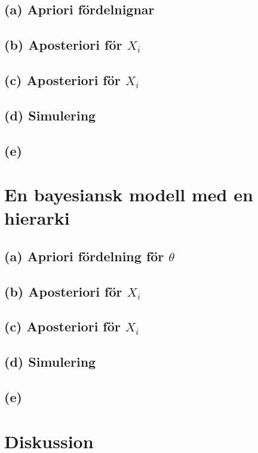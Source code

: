 \documentclass{assignment}
\begin{document}
\subsection*{(a) Apriori fördelnignar} 
\subsection*{(b) Aposteriori för $X_i$}
\subsection*{(c) Aposteriori för $X_i$}
\subsection*{(d) Simulering}
\subsection*{(e)}
\section{En bayesiansk modell med en hierarki}
\subsection*{(a) Apriori fördelning för $\theta$} 
\subsection*{(b) Aposteriori för $X_i$}
\subsection*{(c) Aposteriori för $X_i$}
\subsection*{(d) Simulering}
\subsection*{(e)}
\section{Diskussion}

%  
\end{document}
